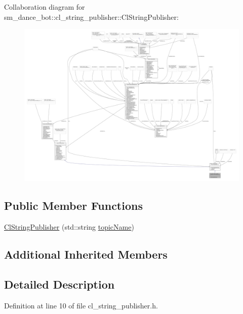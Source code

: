 Collaboration diagram for sm\+\_\+dance\+\_\+bot\+:\+:cl\+\_\+string\+\_\+publisher\+:\+:Cl\+String\+Publisher\+:
\nopagebreak
\begin{figure}[H]
\begin{center}
\leavevmode
\includegraphics[width=350pt]{classsm__dance__bot_1_1cl__string__publisher_1_1ClStringPublisher__coll__graph}
\end{center}
\end{figure}
\subsection*{Public Member Functions}
\begin{DoxyCompactItemize}
\item 
\hyperlink{classsm__dance__bot_1_1cl__string__publisher_1_1ClStringPublisher_aee0c825fe0c073dbb5e676bb396cac39}{Cl\+String\+Publisher} (std\+::string \hyperlink{classsmacc_1_1client__bases_1_1SmaccPublisherClient_a8b8d98aef9b3b3a441005d2cb17b4fcc}{topic\+Name})
\end{DoxyCompactItemize}
\subsection*{Additional Inherited Members}


\subsection{Detailed Description}


Definition at line 10 of file cl\+\_\+string\+\_\+publisher.\+h.




